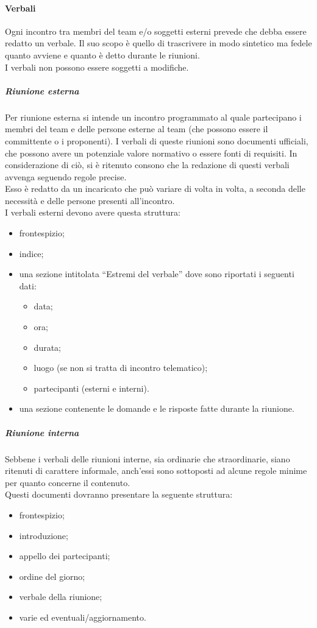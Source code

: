 			\paragraph{Verbali} \label{sec:verbali}
				Ogni incontro tra membri del team e/o soggetti esterni prevede che debba essere redatto un verbale. Il suo scopo è quello di trascrivere in modo sintetico ma fedele quanto avviene e quanto è detto durante le riunioni.\\
				I verbali non possono essere soggetti a modifiche.
				\subparagraph{Riunione esterna}
					Per riunione esterna si intende un incontro programmato al quale partecipano i membri del team e delle persone esterne al team (che possono essere il committente o i proponenti). I verbali di queste riunioni sono documenti ufficiali, che possono avere un potenziale valore normativo o essere fonti di requisiti. In considerazione di ciò, si è ritenuto consono che la redazione di questi verbali avvenga seguendo regole precise.\\
					Esso è redatto da un incaricato che può variare di volta in volta, a seconda delle necessità e delle persone presenti all’incontro.\\
					I verbali esterni devono avere questa struttura:
					\begin{itemize}
						\item frontespizio;
						\item indice;
						\item una sezione intitolata “Estremi del verbale” dove sono riportati i seguenti dati:
						\begin{itemize}
							\item data;
							\item ora;
							\item durata;
							\item luogo (se non si tratta di incontro telematico);
							\item partecipanti (esterni e interni).
						\end{itemize}
						\item una sezione contenente le domande e le risposte fatte durante la riunione.
					\end{itemize}
				\subparagraph{Riunione interna}
					Sebbene i verbali delle riunioni interne, sia ordinarie che straordinarie, siano ritenuti di carattere informale, anch'essi sono sottoposti ad alcune regole minime per quanto concerne il contenuto.  \\
					Questi documenti dovranno presentare la seguente struttura:
					\begin{itemize}
						\item frontespizio;
						\item introduzione;
						\item appello dei partecipanti;
						\item ordine del giorno;
						\item verbale della riunione;
						\item varie ed eventuali/aggiornamento.
					\end{itemize}
